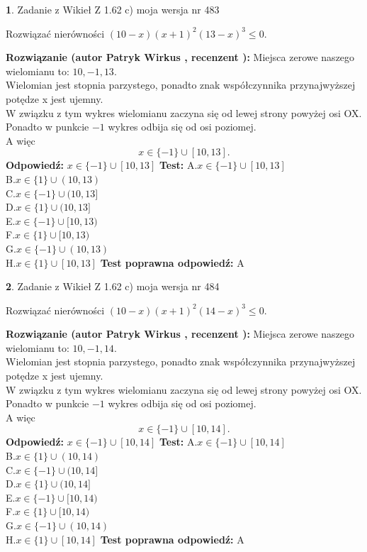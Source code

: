 \documentclass[12pt, a4paper]{article}
\theoremstyle{definition} %
\newtheorem{zad}{}
\newcommand{\zadStart}[1]{\begin{zad}#1\newline}
\newcommand{\zadStop}{\end{zad}}
\newcommand{\rozwStart}[2]{\noindent \textbf{Rozwiązanie (autor #1 , recenzent #2): }\newline}
\newcommand{\rozwStop}{\newline}
\newcommand{\odpStart}{\noindent \textbf{Odpowiedź:}\newline}
\newcommand{\odpStop}{\newline}
\newcommand{\testStart}{\noindent \textbf{Test:}\newline}
\newcommand{\testStop}{\newline}
\newcommand{\kluczStart}{\noindent \textbf{Test poprawna odpowiedź:}\newline}
\newcommand{\kluczStop}{\newline}
\begin{document}
\zadStart{Zadanie z Wikieł Z 1.62 c) moja wersja nr 483}

Rozwiązać nierówności $(10-x)(x+1)^{2}(13-x)^{3}\le0$.
\zadStop
\rozwStart{Patryk Wirkus}{}
Miejsca zerowe naszego wielomianu to: $10, -1, 13$.\\
Wielomian jest stopnia parzystego, ponadto znak współczynnika przy\linebreak najwyższej potędze x jest ujemny.\\ W związku z tym wykres wielomianu zaczyna się od lewej strony powyżej osi OX.\\
Ponadto w punkcie $-1$ wykres odbija się od osi poziomej.\\
A więc $$x \in \{-1\} \cup [10,13].$$
\rozwStop
\odpStart
$x \in \{-1\} \cup [10,13]$
\odpStop
\testStart
A.$x \in \{-1\} \cup [10,13]$\\
B.$x \in \{1\} \cup (10,13)$\\
C.$x \in \{-1\} \cup (10,13]$\\
D.$x \in \{1\} \cup (10,13]$\\
E.$x \in \{-1\} \cup [10,13)$\\
F.$x \in \{1\} \cup [10,13)$\\
G.$x \in \{-1\} \cup (10,13)$\\
H.$x \in \{1\} \cup [10,13]$
\testStop
\kluczStart
A
\kluczStop



\zadStart{Zadanie z Wikieł Z 1.62 c) moja wersja nr 484}

Rozwiązać nierówności $(10-x)(x+1)^{2}(14-x)^{3}\le0$.
\zadStop
\rozwStart{Patryk Wirkus}{}
Miejsca zerowe naszego wielomianu to: $10, -1, 14$.\\
Wielomian jest stopnia parzystego, ponadto znak współczynnika przy\linebreak najwyższej potędze x jest ujemny.\\ W związku z tym wykres wielomianu zaczyna się od lewej strony powyżej osi OX.\\
Ponadto w punkcie $-1$ wykres odbija się od osi poziomej.\\
A więc $$x \in \{-1\} \cup [10,14].$$
\rozwStop
\odpStart
$x \in \{-1\} \cup [10,14]$
\odpStop
\testStart
A.$x \in \{-1\} \cup [10,14]$\\
B.$x \in \{1\} \cup (10,14)$\\
C.$x \in \{-1\} \cup (10,14]$\\
D.$x \in \{1\} \cup (10,14]$\\
E.$x \in \{-1\} \cup [10,14)$\\
F.$x \in \{1\} \cup [10,14)$\\
G.$x \in \{-1\} \cup (10,14)$\\
H.$x \in \{1\} \cup [10,14]$
\testStop
\kluczStart
A
\kluczStop
\end{document}
